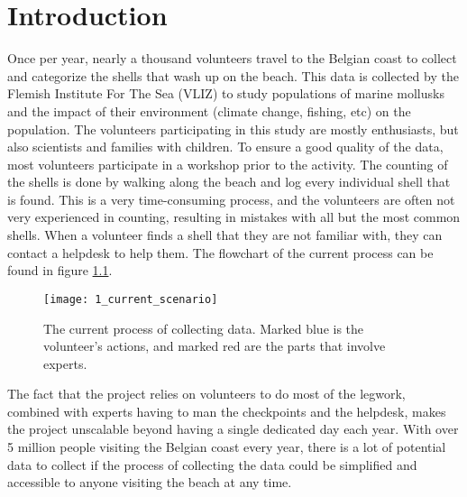 
\chapter{Introduction}

Once per year, nearly a thousand volunteers travel to the Belgian coast to collect and categorize the shells that wash up on the beach. This data is collected by the Flemish Institute For The Sea (VLIZ) to study populations of marine mollusks and the impact of their environment (climate change, fishing, etc) on the population. The volunteers participating in this study are mostly enthusiasts, but also scientists and families with children. To ensure a good quality of the data, most volunteers participate in a workshop prior to the activity. The counting of the shells is done by walking along the beach and log every individual shell that is found. This is a very time-consuming process, and the volunteers are often not very experienced in counting, resulting in mistakes with all but the most common shells. When a volunteer finds a shell that they are not familiar with, they can contact a helpdesk to help them. The flowchart of the current process can be found in figure \ref{fig:1_current_scenario}. 

\begin{figure}[h]
	\centering
	\texttt{[image: 1\_current\_scenario]}
	\caption{\label{fig:1_current_scenario}The current process of collecting data. \newline
	Marked blue is the volunteer's actions, and marked red are the parts that involve experts.}
\end{figure}

The fact that the project relies on volunteers to do most of the legwork, combined with experts having to man the checkpoints and the helpdesk, makes the project unscalable beyond having a single dedicated day each year. With over 5 million people
visiting the Belgian coast every year\cite{Kustportaal}, there is a lot of potential data to collect if the process of collecting the data could be simplified and accessible to anyone visiting the beach at any time.

